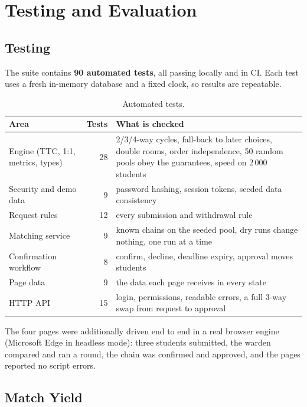 \documentclass{tietreport}
\begin{document}
\chapter{Testing and Evaluation}
\label{ch:eval}

\section{Testing}

The suite contains \textbf{90 automated tests}, all passing locally
and in CI. Each test uses a fresh in-memory database and a fixed clock,
so results are repeatable.

\begin{table}[H]
\centering
\begin{tabularx}{\textwidth}{@{}lrL@{}}
\toprule
\textbf{Area} & \textbf{Tests} & \textbf{What is checked} \\
\midrule
Engine (TTC, 1:1, metrics, types) & 28 & 2/3/4-way cycles, fall-back to later choices, double rooms, order independence, 50 random pools obey the guarantees, speed on 2\,000 students \\
Security and demo data & 9 & password hashing, session tokens, seeded data consistency \\
Request rules & 12 & every submission and withdrawal rule \\
Matching service & 9 & known chains on the seeded pool, dry runs change nothing, one run at a time \\
Confirmation workflow & 8 & confirm, decline, deadline expiry, approval moves students \\
Page data & 9 & the data each page receives in every state \\
HTTP API & 15 & login, permissions, readable errors, a full 3-way swap from request to approval \\
\bottomrule
\end{tabularx}
\caption{Automated tests.}
\end{table}

The four pages were additionally driven end to end in a real browser
engine (Microsoft Edge in headless mode): three students submitted,
the warden compared and ran a round, the chain was confirmed and
approved, and the pages reported no script errors.

\section{Match Yield}
\end{document}
